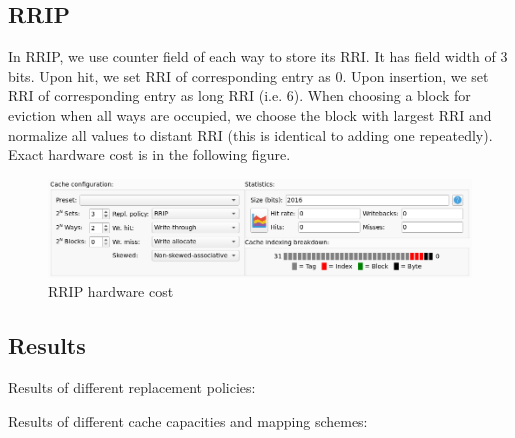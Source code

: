 \documentclass[utf8]{article}
\begin{document}
\subsection{RRIP}
In RRIP, we use counter field of each way to store its RRI. It has field width of 3 bits. Upon hit, we set RRI of corresponding entry as 0. Upon insertion, we set RRI of corresponding entry as long RRI (i.e. 6). When choosing a block for eviction when all ways are occupied, we choose the block with largest RRI and normalize all values to distant RRI (this is identical to adding one repeatedly). Exact hardware cost is in the following figure.
\begin{figure}[h]
	\centering
	\includegraphics[width=0.7\linewidth]{screenshot003}
	\caption{RRIP hardware cost}
	\label{fig:screenshot003}
\end{figure}

\subsection{Results}
Results of different replacement policies:
\newline

\newline

\noindent
Results of different cache capacities and mapping schemes:
\newline
\end{document}
